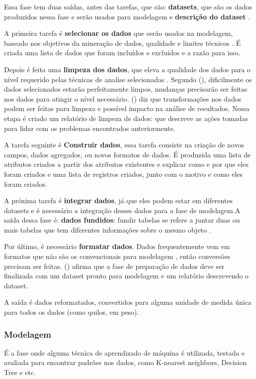 Essa fase tem duas saídas, antes das tarefas, que são: \textbf{datasets}, que são os dados produzidos nessa fase e serão usados para modelagem e \textbf{descrição do dataset} \citep{crispmanual}.

A primeira tarefa é \textbf{selecionar os dados} que serão usados na modelagem, baseado nos objetivos da mineração de dados, qualidade e limites técnicos \citep{crispmanual}. É criada uma lista de dados que foram incluídos e excluídos e a razão para isso.

Depois é feita uma \textbf{limpeza dos dados}, que eleva a qualidade dos dados para o nível requerido pelas técnicas de analise selecionadas \citep{crispmanual}. Segundo \citeauthor{dmfd} (\citeyear{dmfd}), dificilmente os dados selecionados estarão perfeitamente limpos, mudanças precisarão ser feitas nos dados para atingir o nível necessário. \citeauthor{crispmanual} (\citeyear{crispmanual}) diz que transformações nos dados podem ser feitas para limpeza e possível impacto na análise de resultados. Nessa etapa é criado um relatório de limpeza de dados: que descreve as ações tomadas para lidar com os problemas encontrados anteriormente.

A tarefa seguinte é \textbf{Construir dados}, essa tarefa consiste na criação de novos campos, dados agregados, ou novos formatos de dados. É produzida uma lista de atributos criados a partir dos atributos existentes e explicar como e por que eles foram criados e uma lista de registros criados, junto com o motivo e como eles foram criados.

A próxima tarefa é \textbf{integrar dados}, já que eles podem estar em diferentes datasets e é necessário a integração desses dados para a fase de modelagem.A saída dessa fase é: \textbf{dados fundidos}: fundir tabelas se refere a juntar duas ou mais tabelas que tem diferentes informações sobre o mesmo objeto \citep{crispmanual}. 

Por último, é necessário \textbf{formatar dados}. Dados frequentemente vem em formatos que não são os convencionais para modelagem \citep{dmfd}, então conversões precisam ser feitas. \citeauthor{dmfd} (\citeyear{dmfd}) afirma que a fase de preparação de dados deve ser finalizada com um dataset pronto para modelagem e um relatório descrevendo o dataset.

A saída é dados reformatados, convertidos para alguma unidade de medida única para todos os dados (como quilos, em peso).

\subsubsection{Modelagem}
É a fase onde alguma técnica de aprendizado de máquina é utilizada, testada e avaliada para encontrar padrões nos dados, como K-nearest neighbors, Decision Tree e etc.

